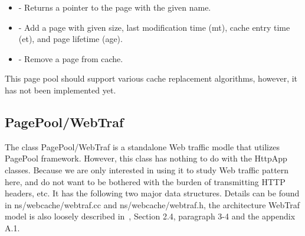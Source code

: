 \begin{itemize}
\item {} - Returns a pointer to the
  page with the given name. 
\item {} - Add a page with given size, last modification
    time (mt), cache entry time (et), and page lifetime (age). 
\item {} - Remove a page from cache.
\end{itemize}

This page pool should support various cache replacement algorithms,
however, it has not been implemented yet. 

\subsection{PagePool/WebTraf}

The class PagePool/WebTraf is a standalone Web traffic modle that utilizes
PagePool framework. However, this class has nothing to do with the HttpApp 
classes. Because we are only interested in using it to study Web traffic 
pattern here, and do not want to be bothered with the burden of 
transmitting HTTP headers, etc. It has the following two major data structures.
Details can be found in ns/webcache/webtraf.cc and ns/webcache/webtraf.h, the
architecture WebTraf model is also loosely described in~\cite{Feldmann99a}, 
Section 2.4, paragraph 3-4 and the appendix A.1.

